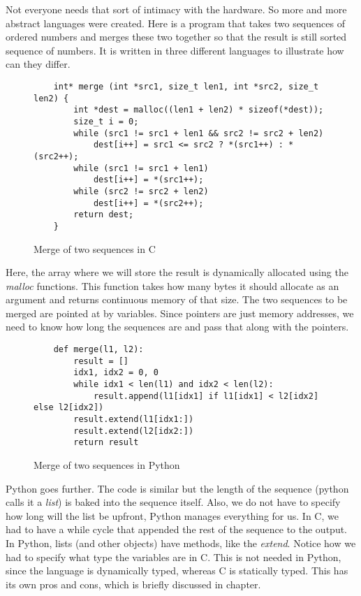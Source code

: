 Not everyone needs that sort of intimacy with the hardware. So more and more abstract languages were created.
Here is a program that takes two sequences of ordered numbers and merges these two together so that the result
is still sorted sequence of numbers. It is written in three different languages to illustrate how can they differ.

\begin{figure}[H]\label{fig:merge-c}
    \begin{verbatim}
    int* merge (int *src1, size_t len1, int *src2, size_t len2) {
        int *dest = malloc((len1 + len2) * sizeof(*dest));
        size_t i = 0;
        while (src1 != src1 + len1 && src2 != src2 + len2)
            dest[i++] = src1 <= src2 ? *(src1++) : *(src2++);
        while (src1 != src1 + len1)
            dest[i++] = *(src1++);
        while (src2 != src2 + len2)
            dest[i++] = *(src2++);
        return dest;
    }
    \end{verbatim}
    \caption{Merge of two sequences in C}
\end{figure}

Here, the array where we will store the result is dynamically allocated using
the \textit{malloc} functions. This function takes how many bytes it should
allocate as an argument and returns continuous memory of that size. The two
sequences to be merged are pointed at by variables. Since pointers are just
memory addresses, we need to know how long the sequences are and pass that
along with the pointers.

\begin{figure}[H]
    \begin{verbatim}
    def merge(l1, l2):
        result = []
        idx1, idx2 = 0, 0
        while idx1 < len(l1) and idx2 < len(l2):
            result.append(l1[idx1] if l1[idx1] < l2[idx2] else l2[idx2])
        result.extend(l1[idx1:])
        result.extend(l2[idx2:])
        return result
    \end{verbatim}
    \caption{Merge of two sequences in Python}
\end{figure}

Python goes further. The code is similar but the length of the sequence (python calls it a \textit{list})
is baked into the sequence itself. Also, we do not have to specify how long will the list be upfront,
Python manages everything for us. In C, we had to have a while cycle that appended
the rest of the sequence to the output. In Python, lists (and other objects) have methods,
like the \textit{extend}. Notice how we had to specify what type the variables are in C.
This is not needed in Python, since the language is dynamically typed, whereas 
C is statically typed. This has its own pros and cons, which is briefly discussed in  chapter.

